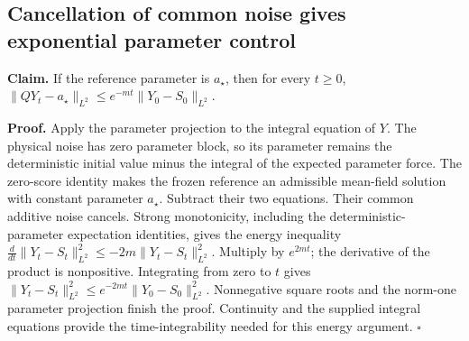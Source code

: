 \documentclass[11pt,a4paper]{report}
\begin{document}
\subsection{\texorpdfstring{Cancellation of common noise gives exponential parameter control}{Cancellation of common noise gives exponential parameter control}}


\textbf{Claim.} If the reference parameter is \(a_\star\), then for every \(t\ge0\), \(\|QY_t-a_\star\|_{L^2}\le e^{-mt}\|Y_0-S_0\|_{L^2}\).



\textbf{Proof.} Apply the parameter projection to the integral equation of \(Y\). The physical noise has zero parameter block, so its parameter remains the deterministic initial value minus the integral of the expected parameter force. The zero-score identity makes the frozen reference an admissible mean-field solution with constant parameter \(a_\star\). Subtract their two equations. Their common additive noise cancels. Strong monotonicity, including the deterministic-parameter expectation identities, gives the energy inequality \(\frac d{dt}\|Y_t-S_t\|_{L^2}^2\le-2m\|Y_t-S_t\|_{L^2}^2\). Multiply by \(e^{2mt}\); the derivative of the product is nonpositive. Integrating from zero to \(t\) gives \(\|Y_t-S_t\|_{L^2}^2\le e^{-2mt}\|Y_0-S_0\|_{L^2}^2\). Nonnegative square roots and the norm-one parameter projection finish the proof. Continuity and the supplied integral equations provide the time-integrability needed for this energy argument. \(\square\)
\end{document}
